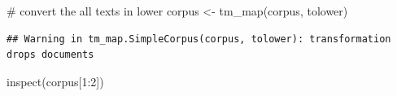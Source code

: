 \documentclass[
]{article}
\newenvironment{Shaded}{}{}
\newcommand{\CommentTok}[1]{\textcolor[rgb]{0.30,0.53,0.42}{#1}}
\newcommand{\DecValTok}[1]{\textcolor[rgb]{0.00,0.00,0.80}{#1}}
\newcommand{\FunctionTok}[1]{#1}
\newcommand{\NormalTok}[1]{#1}
\newcommand{\OtherTok}[1]{\textcolor[rgb]{1.00,0.25,0.00}{#1}}
\newcommand{\SpecialCharTok}[1]{\textcolor[rgb]{0.00,0.50,0.50}{#1}}
\begin{document}
\begin{Shaded}
\begin{Highlighting}[]
\CommentTok{\# convert the all texts in lower}
\NormalTok{corpus }\OtherTok{\textless{}{-}} \FunctionTok{tm\_map}\NormalTok{(corpus, tolower)}
\end{Highlighting}
\end{Shaded}

\begin{verbatim}
## Warning in tm_map.SimpleCorpus(corpus, tolower): transformation drops documents
\end{verbatim}

\begin{Shaded}
\begin{Highlighting}[]
\FunctionTok{inspect}\NormalTok{(corpus[}\DecValTok{1}\SpecialCharTok{:}\DecValTok{2}\NormalTok{])}
\end{Highlighting}
\end{Shaded}
\end{document}
